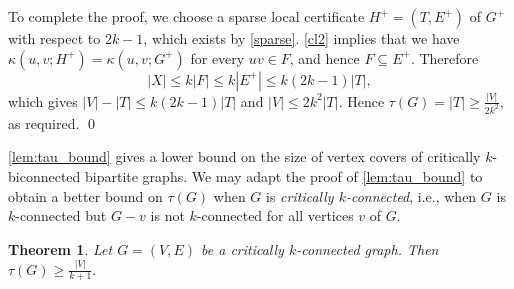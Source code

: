 \documentclass[11pt,a4paper,dvipsnames]{scrartcl}
\newtheorem{theorem}{Theorem}[section]
\begin{document}
To complete the proof, we choose a sparse local certificate $H^+=(T,E^+)$ of $G^+$ with respect to $2k-1$, which exists by \cref{sparse}. \cref{cl2} implies that we have $\kappa(u,v;H^+) = \kappa(u,v;G^+)$ for every $uv \in F$, and hence $F\subseteq E^+$. Therefore \[|X|\leq k|F|\leq k|E^+| \leq k(2k-1)|T|,\] which gives $|V|-|T|\leq k(2k-1)|T|$ and $|V|\leq 2k^2|T|$. Hence $\tau(G)=|T|\geq \frac{|V|}{2k^2}$, as required. 
\qed
\medskip


\cref{lem:tau_bound} gives a lower bound on the size of vertex covers of critically $k$-biconnected bipartite graphs. We may adapt the proof of \cref{lem:tau_bound} to obtain a better bound on $\tau(G)$ when $G$ is \emph{critically $k$-connected}, i.e., when $G$ is $k$-connected  but $G - v$ is not $k$-connected for all vertices $v$ of  $G$. 

\begin{theorem}\label{lem:tau_bound2}
    Let $G=(V,E)$ be a critically $k$-connected graph. Then $\tau(G)\geq \frac{|V|}{k+1}.$
\end{theorem}
\end{document}
